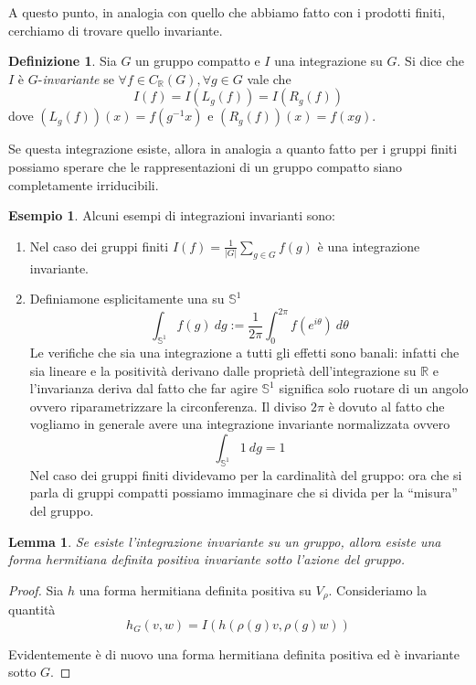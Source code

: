 \documentclass[11pt]{article}
\theoremstyle{plain}
\newtheorem{lemma}[thm]{Lemma}
\theoremstyle{definition}
\newtheorem{defn}{Definizione}[section]
\newtheorem{exmp}{Esempio}[section]
\theoremstyle{remark}
\newcommand{\R}{\mathbb{R}}
\newcommand{\dint}{\displaystyle\int}
\begin{document}
A questo punto, in analogia con quello che abbiamo fatto con i prodotti finiti, cerchiamo di trovare quello invariante.

\begin{defn} Sia $G$ un gruppo compatto e $I$ una integrazione su $G$. Si dice che $I$ è $G$-\textit{invariante} se $\forall f\in C_{\R}(G), \forall g\in G$ vale che
\[ I(f) = I(L_g(f)) = I(R_g(f))\]
dove $(L_g(f))(x) = f(g^{-1}x)$ e $(R_g(f))(x) = f(xg)$.
\end{defn}
Se questa integrazione esiste, allora in analogia a quanto fatto per i gruppi finiti possiamo sperare che le rappresentazioni di un gruppo compatto siano completamente irriducibili.


\begin{exmp}Alcuni esempi di integrazioni invarianti sono:
	\begin{enumerate}
		\item Nel caso dei gruppi finiti $I(f)=\frac{1}{|G|}\sum_{g\in G}f(g)$ è una integrazione invariante.
		\item Definiamone esplicitamente una su $\mathbb{S}^1$
		\[\dint_{\mathbb{S}^1}f(g)\ dg:=\frac{1}{2\pi}\dint_0^{2\pi}f(e^{i\theta})\ d\theta\]
		Le verifiche che sia una integrazione a tutti gli effetti sono banali: infatti che sia lineare e la positività derivano dalle proprietà dell'integrazione su $\R$ e l'invarianza deriva dal fatto che far agire $\mathbb{S}^1$ significa solo ruotare di un angolo ovvero riparametrizzare la circonferenza.
		Il diviso $2\pi$ è dovuto al fatto che vogliamo in generale avere una integrazione invariante normalizzata ovvero
		\[\dint_{\mathbb{S}^1}1\ dg=1\]
		Nel caso dei gruppi finiti dividevamo per la cardinalità del gruppo: ora che si parla di gruppi compatti possiamo immaginare che si divida per la ``misura'' del gruppo.
	\end{enumerate}
\end{exmp}

\begin{lemma}
  Se esiste l'integrazione invariante su un gruppo, allora esiste una forma hermitiana definita positiva invariante sotto l'azione del gruppo.
\end{lemma}
\begin{proof}
  Sia $h$ una forma hermitiana definita positiva su $V_\rho$. Consideriamo la quantità
  \[ h_G(v,w) = I( h(\rho(g) v, \rho(g) w)) \]

  Evidentemente è di nuovo una forma hermitiana definita positiva ed è invariante sotto $G$.


\end{proof}
\end{document}
